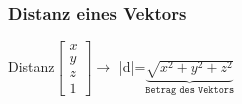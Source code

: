 %
%			
%	
%    	
%	
%	
%	
%
\begin{minipage}[t]{0.33\linewidth}
     \subsubsection{Distanz eines Vektors}
    Distanz$\begin{bmatrix}
    x\\
    y\\
    z\\
    1
    \end{bmatrix}\rightarrow$ |d|=$\underbrace{\sqrt{x^2+y^2+z^2}}_{\texttt{Betrag des Vektors}}$
\end{minipage}
